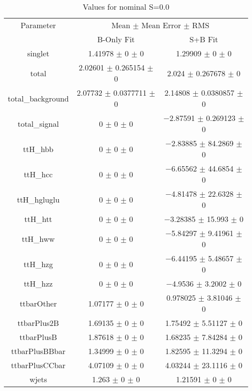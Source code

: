 \begin{table}
\centering
\caption{Values for nominal S=0.0}
\begin{tabular}{ccc}
\toprule
Parameter & \multicolumn{2}{c}{Mean $\pm$ Mean Error $\pm$ RMS}\\
 & B-Only Fit & S+B Fit\\
\midrule
singlet & \num{1.41978} $\pm$ \num{0} $\pm$ \num{0} & \num{1.29909} $\pm$ \num{0} $\pm$ \num{0}\\
total & \num{2.02601} $\pm$ \num{0.265154} $\pm$ \num{0} & \num{2.024} $\pm$ \num{0.267678} $\pm$ \num{0}\\
total\_background & \num{2.07732} $\pm$ \num{0.0377711} $\pm$ \num{0} & \num{2.14808} $\pm$ \num{0.0380857} $\pm$ \num{0}\\
total\_signal & \num{0} $\pm$ \num{0} $\pm$ \num{0} & \num{-2.87591} $\pm$ \num{0.269123} $\pm$ \num{0}\\
ttH\_hbb & \num{0} $\pm$ \num{0} $\pm$ \num{0} & \num{-2.83885} $\pm$ \num{84.2869} $\pm$ \num{0}\\
ttH\_hcc & \num{0} $\pm$ \num{0} $\pm$ \num{0} & \num{-6.65562} $\pm$ \num{44.6854} $\pm$ \num{0}\\
ttH\_hgluglu & \num{0} $\pm$ \num{0} $\pm$ \num{0} & \num{-4.81478} $\pm$ \num{22.6328} $\pm$ \num{0}\\
ttH\_htt & \num{0} $\pm$ \num{0} $\pm$ \num{0} & \num{-3.28385} $\pm$ \num{15.993} $\pm$ \num{0}\\
ttH\_hww & \num{0} $\pm$ \num{0} $\pm$ \num{0} & \num{-5.84297} $\pm$ \num{9.41961} $\pm$ \num{0}\\
ttH\_hzg & \num{0} $\pm$ \num{0} $\pm$ \num{0} & \num{-6.44195} $\pm$ \num{5.48657} $\pm$ \num{0}\\
ttH\_hzz & \num{0} $\pm$ \num{0} $\pm$ \num{0} & \num{-4.9536} $\pm$ \num{3.2002} $\pm$ \num{0}\\
ttbarOther & \num{1.07177} $\pm$ \num{0} $\pm$ \num{0} & \num{0.978025} $\pm$ \num{3.81046} $\pm$ \num{0}\\
ttbarPlus2B & \num{1.69135} $\pm$ \num{0} $\pm$ \num{0} & \num{1.75492} $\pm$ \num{5.51127} $\pm$ \num{0}\\
ttbarPlusB & \num{1.87618} $\pm$ \num{0} $\pm$ \num{0} & \num{1.68235} $\pm$ \num{7.84284} $\pm$ \num{0}\\
ttbarPlusBBbar & \num{1.34999} $\pm$ \num{0} $\pm$ \num{0} & \num{1.82595} $\pm$ \num{11.3294} $\pm$ \num{0}\\
ttbarPlusCCbar & \num{4.07109} $\pm$ \num{0} $\pm$ \num{0} & \num{4.03244} $\pm$ \num{23.1116} $\pm$ \num{0}\\
wjets & \num{1.263} $\pm$ \num{0} $\pm$ \num{0} & \num{1.21591} $\pm$ \num{0} $\pm$ \num{0}\\
\bottomrule
\end{tabular}
\end{table}